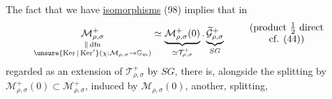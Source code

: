 The fact that  we have \uline{isomorphisms} (98)
implies that in
\[
\underset{\substack{\Vert\,\mathrm{dfn}\\
\unsure{\operatorname{Ker}|\operatorname{Ker}'}
(\chi:\mathcal M_{\rho,\sigma}\to \mathbb G_m)}}{\mathcal M_{\rho,\sigma}^{+}}
\simeq
\underbrace{\mathcal M_{\rho,\sigma}^{+}(0)}_{\simeq\mathcal T_{\rho,\sigma}^{+}}
\mathbin{.}
\underbrace{\widetilde{\mathcal G}_{\rho,\sigma}^{+}}_{SG}
\qquad\begin{array}{c}(\text{product }\tfrac12\text{ direct}\\\text{cf. (44)})\end{array}
\]
regarded as an extension of $\mathcal T_{\rho,\sigma}^{+}$ by $SG$,
there is, alongside the splitting by $\mathcal M_{\rho,\sigma}^{+}(0)\subset\mathcal M_{\rho,\sigma}^{+}$,
induced by $\mathcal M_{\rho,\sigma}(0)$, another, splitting,

\par{}